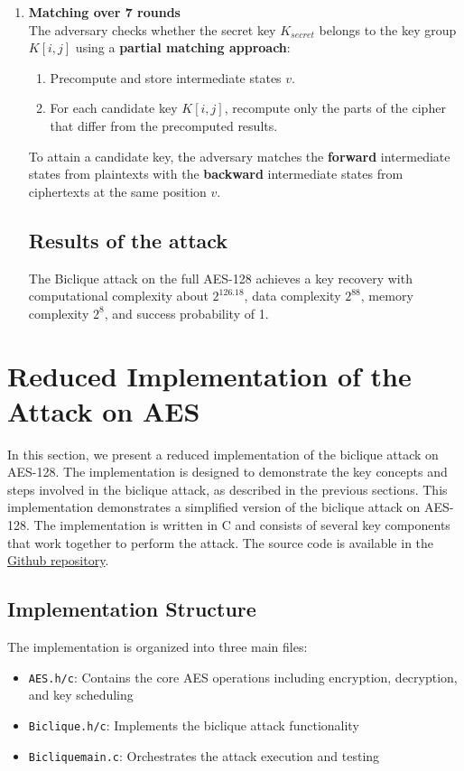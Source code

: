 \documentclass{report}
\begin{document}
\begin{enumerate}[start = 1, label={(\bfseries Step\arabic*):}]
 \item \textbf{Matching over 7 rounds\cite{bogdanov2011biclique}}\\The adversary checks whether the secret key $K_{secret}$ belongs to the key group $K[i, j]$ using a \textbf{partial matching approach}:

 \begin{enumerate}
     \item Precompute and store intermediate states $v$.
     \item For each candidate key $K[i,j]$, recompute only the parts of the cipher that differ from the precomputed results.
 \end{enumerate}
 
 To attain a candidate key, the adversary matches the \textbf{forward} intermediate states from plaintexts with the \textbf{backward} intermediate states from ciphertexts at the same position $v$.
 
 \subsection{Results of the attack}
 The Biclique attack on the full AES-128 achieves a key recovery with computational complexity about $2^{126.18}$, data complexity $2^{88}$, memory complexity $2^8$, and success probability of 1.\cite{bogdanov2011biclique}
 
 \end{enumerate}

 \section{Reduced Implementation of the Attack on AES}
 In this section, we present a reduced implementation of the biclique attack on AES-128. The implementation is designed to demonstrate the key concepts and steps involved in the biclique attack, as described in the previous sections. This implementation demonstrates a simplified version of the biclique attack on AES-128. The implementation is written in C and consists of several key components that work together to perform the attack.
 The source code is available in the \href{https://github.com/MortazaHassani/Biclique-Attack-on-AES-128/}{Github repository}. 
 \subsection{Implementation Structure}
The implementation is organized into three main files:
\begin{itemize}
    \item \texttt{AES.h/c}: Contains the core AES operations including encryption, decryption, and key scheduling
    \item \texttt{Biclique.h/c}: Implements the biclique attack functionality
    \item \texttt{Bicliquemain.c}: Orchestrates the attack execution and testing
\end{itemize}
\end{document}
